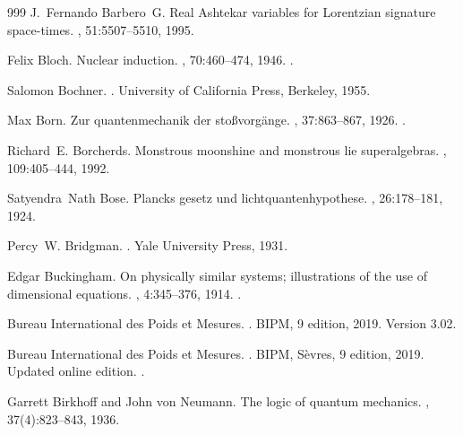 \begin{thebibliography}{999}
J.~Fernando Barbero~G.
\newblock Real {Ashtekar} variables for {Lorentzian} signature space-times.
, 51:5507--5510, 1995.

Felix Bloch.
\newblock Nuclear induction.
, 70:460--474, 1946.
\newblock \href {https://doi.org/10.1103/PhysRev.70.460}
  {}.

Salomon Bochner.
.
\newblock University of California Press, Berkeley, 1955.

Max Born.
\newblock Zur quantenmechanik der sto{\ss}vorg{\"a}nge.
, 37:863--867, 1926.
\newblock \href {https://doi.org/10.1007/BF01397477}
  {}.

Richard~E. Borcherds.
\newblock Monstrous moonshine and monstrous lie superalgebras.
, 109:405--444, 1992.

 Satyendra~Nath Bose.
\newblock Plancks gesetz und lichtquantenhypothese.
, 26:178--181, 1924.

Percy~W. Bridgman.
.
\newblock Yale University Press, 1931.

Edgar Buckingham.
\newblock On physically similar systems; illustrations of the use of
  dimensional equations.
, 4:345--376, 1914.
\newblock \href {https://doi.org/10.1103/PhysRev.4.345}
  {}.

{Bureau International des Poids et Mesures}.
.
\newblock BIPM, 9 edition, 2019.
\newblock Version 3.02.

{Bureau International des Poids et Mesures}.
.
\newblock BIPM, S\`evres, 9 edition, 2019.
\newblock Updated online edition.
\newblock \href {https://doi.org/10.59161/AUEZ1291}
  {}.

Garrett Birkhoff and John von Neumann.
\newblock The logic of quantum mechanics.
, 37(4):823--843, 1936.


\end{thebibliography}
